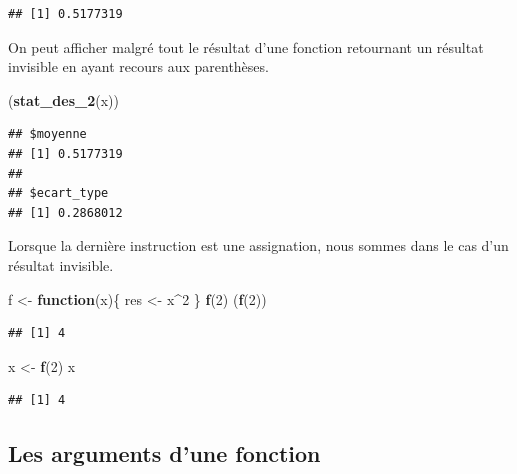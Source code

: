 \documentclass[
  11pt,
]{book}
\newenvironment{Shaded}{\begin{snugshade}}{\end{snugshade}}
\newcommand{\ControlFlowTok}[1]{\textcolor[rgb]{0.13,0.29,0.53}{\textbf{#1}}}
\newcommand{\DecValTok}[1]{\textcolor[rgb]{0.00,0.00,0.81}{#1}}
\newcommand{\KeywordTok}[1]{\textcolor[rgb]{0.13,0.29,0.53}{\textbf{#1}}}
\newcommand{\NormalTok}[1]{#1}
\newcommand{\OperatorTok}[1]{\textcolor[rgb]{0.81,0.36,0.00}{\textbf{#1}}}
\newcommand{\StringTok}[1]{\textcolor[rgb]{0.31,0.60,0.02}{#1}}
\numberwithin{equation}{section}
\numberwithin{countremarque}{section}
\begin{document}
\begin{lstlisting}
## [1] 0.5177319
\end{lstlisting}

On peut afficher malgré tout le résultat d'une fonction retournant un résultat invisible en ayant recours aux parenthèses.

\begin{Shaded}
\begin{Highlighting}[]
\NormalTok{(}\KeywordTok{stat\_des\_2}\NormalTok{(x))}
\end{Highlighting}
\end{Shaded}

\begin{lstlisting}
## $moyenne
## [1] 0.5177319
## 
## $ecart_type
## [1] 0.2868012
\end{lstlisting}

Lorsque la dernière instruction est une assignation, nous sommes dans le cas d'un résultat invisible.

\begin{Shaded}
\begin{Highlighting}[]
\NormalTok{f \textless{}{-}}\StringTok{ }\ControlFlowTok{function}\NormalTok{(x)\{}
\NormalTok{  res \textless{}{-}}\StringTok{ }\NormalTok{x}\OperatorTok{\^{}}\DecValTok{2}
\NormalTok{\}}
\KeywordTok{f}\NormalTok{(}\DecValTok{2}\NormalTok{)}
\NormalTok{(}\KeywordTok{f}\NormalTok{(}\DecValTok{2}\NormalTok{))}
\end{Highlighting}
\end{Shaded}

\begin{lstlisting}
## [1] 4
\end{lstlisting}

\begin{Shaded}
\begin{Highlighting}[]
\NormalTok{x \textless{}{-}}\StringTok{ }\KeywordTok{f}\NormalTok{(}\DecValTok{2}\NormalTok{)}
\NormalTok{x}
\end{Highlighting}
\end{Shaded}

\begin{lstlisting}
## [1] 4
\end{lstlisting}

\hypertarget{fonctions_structure_parametres}{%
\subsection{Les arguments d'une fonction}\label{fonctions_structure_parametres}}
\end{document}
